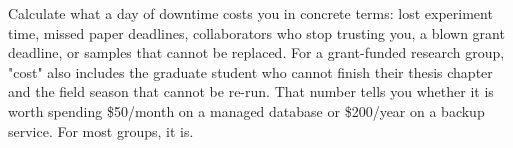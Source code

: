 \documentclass[10pt,letterpaper]{article}
\begin{document}
Calculate what a day of downtime costs you in concrete terms: lost experiment
time, missed paper deadlines, collaborators who stop trusting you, a blown grant
deadline, or samples that cannot be replaced. For a grant-funded research group,
"cost" also includes the graduate student who cannot finish their thesis chapter
and the field season that cannot be re-run. That number tells you whether it is
worth spending \$50/month on a managed database or \$200/year on a backup
service.  For most groups, it is.

\nocite{*}

\end{document}
